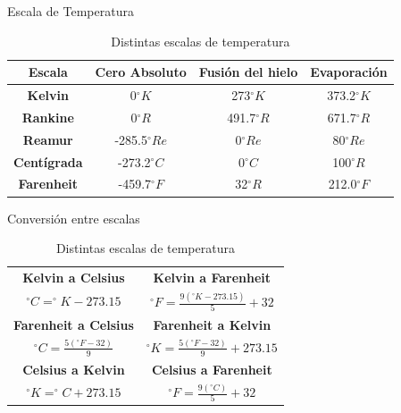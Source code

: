 \documentclass[aspectratio=169]{beamer}
\begin{document}
\begin{frame}{Escala de Temperatura}
\begin{table}[]
    \centering
    \begin{tabular}{c|c|c|c}
     \hline
         \hline
        \textbf{Escala} & \textbf{Cero Absoluto} &\textbf{Fusión del hielo} & \textbf{Evaporación} \\
         \hline
         \hline
       \textbf{Kelvin} & 0$ ^{\circ} K$ & 273$ ^{\circ} K$ & 373.2$ ^{\circ} K$ \\
       \textbf{Rankine} & 0$ ^{\circ} R$ & 491.7$ ^{\circ} R$ & 671.7$ ^{\circ} R$ \\
         \textbf{Reamur} & -285.5$ ^{\circ} Re$ & 0$ ^{\circ} Re$ & 80$ ^{\circ} Re$ \\
        \textbf{Centígrada} & -273.2$ ^{\circ} C$ & 0$ ^{\circ} C$ & 100$ ^{\circ} R$ \\
        \textbf{Farenheit} & -459.7$ ^{\circ} F$ & 32$ ^{\circ} R$ & 212.0$ ^{\circ} F$ \\
    \end{tabular}
    \caption{Distintas escalas de temperatura} \cite{cengel2003termodinamica}
    \label{tab:my_label}
\end{table}
\end{frame}

\begin{frame}{Conversión entre escalas}
\begin{table}[]
    \centering
    \begin{tabular}{|c|c|}
         \hline
        \textbf{Kelvin a Celsius} & \textbf{Kelvin a Farenheit} \\
       \Large{$^{\circ}C=^{\circ}K-273.15$} & \Large{$ ^{\circ} F=\frac{9(^{\circ}K-273.15)}{5}+32$} \\
       \hline
       \textbf{Farenheit a Celsius} & \textbf{Farenheit a Kelvin} \\
       \Large{$^{\circ}C=\frac{5(^{\circ}F-32)}{9}$ } & \Large{$^{\circ}K=\frac{5(^{\circ}F-32)}{9}+273.15$}\\
       \hline
       \textbf{Celsius a Kelvin} & \textbf{Celsius a Farenheit} \\
       \Large{$^{\circ}K=^{\circ}C+273.15$ } & \Large{$^{\circ}F=\frac{9(^{\circ}C)}{5}+32$}\\
       \hline
    \end{tabular}
    \caption{Distintas escalas de temperatura\cite{cengel2003termodinamica}}
    \label{tab:conversi'on}
\end{table}
\end{frame}
\end{document}
